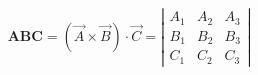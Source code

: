 \documentclass[a4paper]{article}
\begin{document}
\begin{comment}
\left| 
\begin{array}{ccc} 
	A_1 & A_2 & A_3 \\ 
	B_1 & B_2 & B_3 \\ 
	C_1 & C_2 & C_3 
\end{array} 
\right|
\end{comment}

\begin{equation*}
	\mathbf{ABC} = (\vec{A} \times \vec{B}) \cdot \vec{C} = \left| \begin{array}{ccc} A_1 & A_2 & A_3 \\ B_1 & B_2 & B_3 \\ C_1 & C_2 & C_3 \end{array} \right|
\end{equation*}
\end{document}
